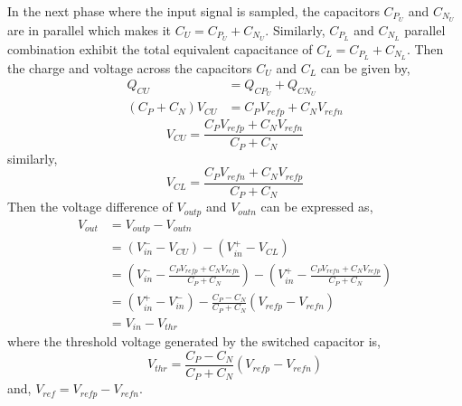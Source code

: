 %
In the next phase where the input signal is sampled, the capacitors $C_{P_{U}}$ and $C_{N_{U}}$ are in parallel which makes it $C_U=C_{P_{U}}+C_{N_{U}}$. Similarly, $C_{P_{L}}$ and $C_{N_{L}}$ parallel combination exhibit the total equivalent capacitance of $C_L=C_{P_{L}}+C_{N_{L}}$. Then the charge and voltage across the capacitors $C_U$ and $C_L$ can be given by,
%
\begin{equation}
    \begin{split}
        Q_{CU} &= Q_{CP_{U}}+Q_{CN_{U}}\\
        (C_P+C_N)V_{CU} &= C_PV_{refp}+C_NV_{refn}
    \end{split}
\end{equation}
%
%
\begin{equation}
        V_{CU}=\frac{C_PV_{refp}+C_NV_{refn}}{C_P+C_N}
\end{equation}
%
similarly,
%
\begin{equation}
        V_{CL}=\frac{C_PV_{refn}+C_NV_{refp}}{C_P+C_N}
\end{equation}
%
Then the voltage difference of $V_{outp}$ and $V_{outn}$ can be expressed as,
%
\begin{equation}
    \begin{split}
        V_{out} &= V_{outp}-V_{outn}\\
                &= (V_{in}^--V_{CU})-(V_{in}^+-V_{CL})\\
                &= \left(V_{in}^--\frac{C_PV_{refp}+C_NV_{refn}}{C_P+C_N}\right)-\left(V_{in}^+-\frac{C_PV_{refn}+C_NV_{refp}}{C_P+C_N}\right)\\
                &= \left(V_{in}^+-V_{in}^-\right)-\frac{C_P-C_N}{C_P+C_N}\left(V_{refp}-V_{refn}\right)\\
                &= V_{in}-V_{thr}
    \end{split}
\end{equation}
%
where the threshold voltage generated by the switched capacitor is,
%
\begin{equation}\label{THR_GEN}
    V_{thr} = \frac{C_P-C_N}{C_P+C_N}\left(V_{refp}-V_{refn}\right)
\end{equation}
%
and, $V_{ref}= V_{refp} - V_{refn}$. 

